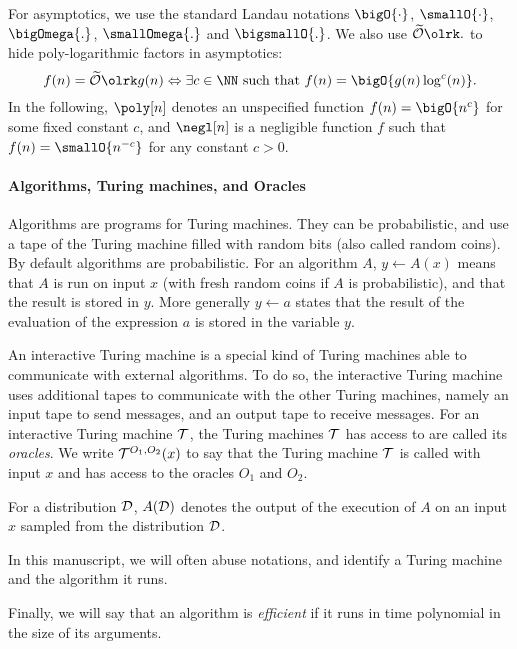 For asymptotics, we use the standard Landau notations $\bigO{\cdot}$, $\smallO{\cdot}$, $\bigOmega{.}$, $\smallOmega{.}$ and $\bigsmallO{.}$.
We also use $\bigOtilde{.}$ to hide poly-logarithmic factors in asymptotics:
\[
	f(n) = \bigOtilde{g(n)} \Leftrightarrow \exists c \in \NN \text{ such that } f(n) = \bigO{g(n) \log^c(n)}.
\]
In the following, $\poly[n]$ denotes an unspecified function $f(n) = \bigO{n^c}$ for some fixed constant $c$, and $\negl[n]$ is a negligible function $f$ such that $f(n) = \smallO{n^{-c}}$ for any constant $c > 0$. 



\paragraph{Algorithms, Turing machines, and Oracles} %
\label{par:def_tm_oracles}

Algorithms are programs for Turing machines.
They can be probabilistic, and use a tape of the Turing machine filled with random bits (also called random coins).
By default algorithms are probabilistic. 
For an algorithm $A$, $y \gets A(x)$ means that $A$ is run on input $x$ (with fresh random coins if $A$ is probabilistic), and that the result is stored in $y$.
More generally $y \gets a$ states that the result of the evaluation of the expression $a$ is stored in the variable $y$.

An interactive Turing machine is a special kind of Turing machines able to communicate with external algorithms. 
To do so, the interactive Turing machine uses additional tapes to communicate with the other Turing machines, namely an input tape to send messages, and an output tape to receive messages.
For an interactive Turing machine $\mathcal{T}$, the Turing machines $\mathcal{T}$ has access to are called its \emph{oracles}.
We write $\mathcal{T}^{O_1, O_2}(x)$ to say that the Turing machine $\mathcal{T}$ is called with input $x$ and has access to the oracles $O_1$ and $O_2$.


For a distribution $\mathcal{D}$, $A(\mathcal{D})$ denotes the output of the execution of $A$ on an input $x$ sampled from the distribution $\mathcal{D}$.


In this manuscript, we will often abuse notations, and identify a Turing machine and the algorithm it runs. 

Finally, we will say that an algorithm is \emph{efficient} if it runs in time polynomial in the size of its arguments.


